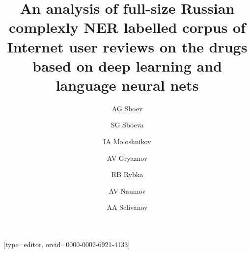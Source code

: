 \documentclass[a4paper,fleqn,longmktitle]{cas-dc}
\begin{document}
\let\WriteBookmarks\relax
\def\floatpagepagefraction{1}
\def\textpagefraction{.001}

\title [mode = title]{An analysis of full-size Russian complexly NER labelled corpus of Internet user reviews on the drugs based on deep learning and  language neural nets }     





\author[1,2]{AG Sboev}[type=editor, orcid=0000-0002-6921-4133]
\cormark[1]
\author[3]{SG Sboeva}


\address[1]{NRC "Kurchatov institute", Moscow, Russia}
\address[2]{MEPhI National Research Nuclear University, Kashirskoye sh., 31, Moscow, 115409, Russia}
\address[3]{I.M. Sechenov First Moscow State Medical University (Sechenov University), Moscow, Russia}


\author[1]{IA Moloshnikov}

\author[1]{AV Gryaznov}

\author[1]{RB Rybka}

\author[1]{AV Naumov}

\author[1]{AA Selivanov}
\end{document}
